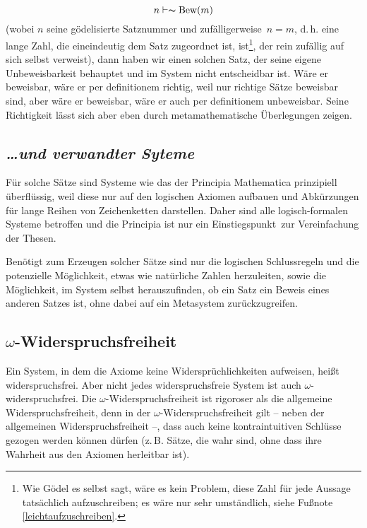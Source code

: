 $$
n \vdash \thicksim \text{Bew}\left(m\right)
$$
(wobei $n$ seine gödelisierte Satznummer und \frq zufälligerweise\flq\ $n = m$, 
d.\,h. eine lange Zahl, die eineindeutig dem
Satz zugeordnet ist, ist\footnote{Wie Gödel es selbst sagt, wäre es kein 
Problem, diese Zahl für jede Aussage tatsächlich 
aufzuschreiben; es wäre nur sehr umständlich, 
siehe Fußnote \ref{leichtaufzuschreiben}.}, der rein zufällig auf sich selbst verweist), 
dann haben wir einen solchen Satz, der seine eigene Unbeweisbarkeit
behauptet und im System nicht entscheidbar ist. Wäre er beweisbar, wäre er per definitionem
richtig, weil nur richtige Sätze beweisbar sind, aber wäre er beweisbar, wäre er auch 
per definitionem unbeweisbar. Seine Richtigkeit lässt sich aber eben durch
metamathematische Überlegungen zeigen.

\subsection*{\frq\textit{\dots und verwandter Syteme}\flq}

Für solche Sätze sind Systeme wie das der Principia Mathematica prinzipiell 
überflüssig,
weil diese nur auf den logischen Axiomen aufbauen und Abkürzungen für lange Reihen von
Zeichenketten darstellen. Daher sind alle logisch-formalen Systeme betroffen und die
Principia ist nur ein \frq Einstiegspunkt\flq\ zur Vereinfachung der Thesen.

Benötigt zum Erzeugen solcher Sätze sind nur die logischen Schlussregeln und die
potenzielle Möglichkeit, etwas wie natürliche Zahlen herzuleiten, sowie die Möglichkeit,
im System selbst herauszufinden, ob ein Satz ein Beweis eines anderen Satzes ist, ohne dabei
auf ein Metasystem zurückzugreifen.

\subsection*{$\omega$-Widerspruchsfreiheit}

Ein System, in dem die Axiome keine Widersprüchlichkeiten aufweisen, heißt
\frq widerspruchsfrei\flq. Aber nicht jedes widerspruchsfreie System ist auch
$\omega$-widerspruchsfrei. Die $\omega$-Widerspruchsfreiheit ist rigoroser als
die allgemeine Widerspruchsfreiheit, denn in der $\omega$-Widerspruchsfreiheit
gilt -- neben der allgemeinen Widerspruchsfreiheit --, dass auch keine kontraintuitiven
Schlüsse gezogen werden können dürfen (z.\,B. Sätze, die wahr sind, ohne dass 
ihre Wahrheit aus den Axiomen herleitbar ist).

